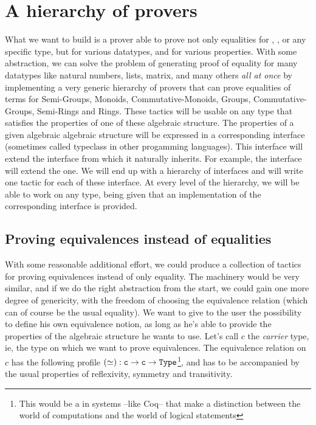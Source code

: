 \section{A hierarchy of provers}

What we want to build is a prover able to prove not only equalities for , , or any specific type, but for various datatypes, and for various properties. With some abstraction, we can solve the problem of generating proof of equality for many datatypes like natural numbers, lists, matrix, and many others \emph{all at once} by implementing a very generic hierarchy of provers that can prove equalities of terms for Semi-Groups, Monoids, Commutative-Monoids, Groups, Commutative-Groups, Semi-Rings and Rings. These tactics will be usable on any type that satisfies the properties of one of these algebraic structure. The properties of a given algebraic algebraic structure will be expressed in a corresponding interface (sometimes called typeclass in other progamming languages). This interface will extend the interface from which it naturally inherits. For example, the  interface will extend the  one. We will end up with a hierarchy of interfaces and will write one tactic for each of these interface. At every level of the hierarchy, we will be able to work on any type, being given that an implementation of the corresponding interface is provided.

	\subsection{Proving equivalences instead of equalities}
	
With some reasonable additional effort, we could produce a collection of tactics for proving equivalences instead of only equality. The machinery would be very similar, and if we do the right abstraction from the start, we could gain one more degree of genericity, with the freedom of choosing the equivalence relation (which can of course be the usual equality). We want to give to the user the possibility to define his own equivalence notion, as long as he's able to provide the properties of the algebraic structure he wants to use. Let's call $c$ the \emph{carrier} type, ie, the type on which we want to prove equivalences. The equivalence relation on $c$ has the following profile $(\simeq) : {\mbox{\texttt{c}}} \rightarrow {\mbox{\texttt{c}}} \rightarrow {\mbox{\texttt{Type}}}$\footnote{This  would be a  in systems --like Coq-- that make a distinction between the world of computations and the world of logical statements}, and has to be accompanied by the usual properties of reflexivity, symmetry and transitivity.

